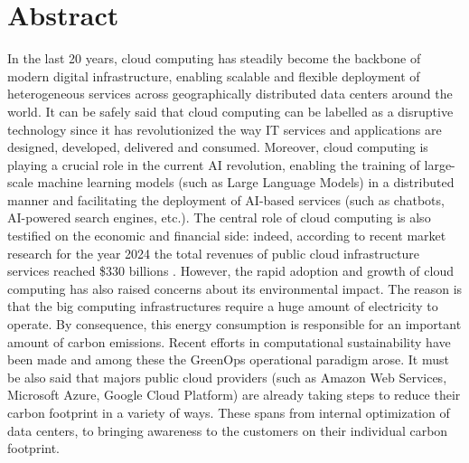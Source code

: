 \chapter*{Abstract} %
\label{abtract}



In the last 20 years, cloud computing has steadily become the backbone of modern digital infrastructure, enabling scalable and flexible deployment of heterogeneous services across geographically distributed data centers around the world.
It can be safely said that cloud computing can be labelled as a disruptive technology since it has revolutionized the way IT services and applications are designed, developed, delivered and consumed.
Moreover, cloud computing is playing a crucial role in the current AI revolution, enabling the training of large-scale machine learning models (such as Large Language Models) in a distributed manner and facilitating the deployment of AI-based services (such as chatbots, AI-powered search engines, etc.).
The central role of cloud computing is also testified on the economic and financial side: indeed, according to recent market research for the year 2024 the total revenues of public cloud infrastructure services reached \$330 billions \cite{statista_cloud_market_share}.
However, the rapid adoption and growth of cloud computing has also raised concerns about its environmental impact.
The reason is that the big computing infrastructures require a huge amount of electricity to operate.
By consequence, this energy consumption is responsible for an important amount of carbon emissions.
Recent efforts in computational sustainability have been made and among these the GreenOps operational paradigm arose.
It must be also said that majors public cloud providers (such as Amazon Web Services, Microsoft Azure, Google Cloud Platform) are already taking steps to reduce their carbon footprint in a variety of ways. 
These spans from internal optimization of data centers, to bringing awareness to the customers on their individual carbon footprint. \newline

